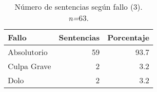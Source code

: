 \begin{table}[!htbp]
\centering
\caption{Número de sentencias según fallo (3). \textit{n=}63.} 
\label{tab:fallo}
\begin{tabular}{lrr}
  \hline
Fallo & Sentencias & Porcentaje \\ 
  \hline
Absolutorio & 59 & 93.7 \\ 
  Culpa Grave &  2 & 3.2 \\ 
  Dolo &  2 & 3.2 \\ 
   \hline
\end{tabular}
\end{table}
